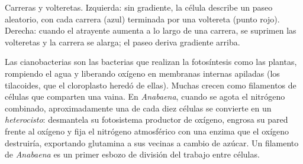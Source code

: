 \begin{omfigure}

{\small Carreras y volteretas. Izquierda: sin gradiente, la célula
describe un paseo aleatorio, con cada carrera (azul) terminada por una
voltereta (punto rojo). Derecha: cuando el atrayente aumenta a lo largo
de una carrera, se suprimen las volteretas y la carrera se alarga; el
paseo deriva gradiente arriba.}
\end{omfigure}

\begin{example}\label{ex:b2:unicellular-diversity:cyanobacteria}
Las cianobacterias son las bacterias que realizan la fotosíntesis como
las plantas, rompiendo el agua y liberando oxígeno en membranas internas
apiladas (los tilacoides, que el cloroplasto heredó de ellas). Muchas
crecen como filamentos de células que comparten una vaina. En
\emph{Anabaena}, cuando se agota el nitrógeno combinado, aproximadamente
una de cada diez células se convierte en un \emph{heterocisto}: desmantela
su fotosistema productor de oxígeno, engrosa su pared frente al oxígeno y
fija el nitrógeno atmosférico con una enzima que el oxígeno destruiría,
exportando glutamina a sus vecinas a cambio de azúcar. Un filamento de
\emph{Anabaena} es un primer esbozo de división del trabajo entre
células.
\end{example}

